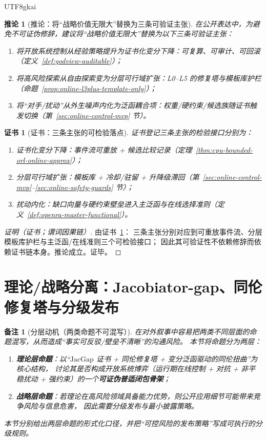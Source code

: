 \documentclass[12pt]{article}
\newtheorem{corollary}{推论}[section]
\newtheorem{remark}{备注}[section]
\newtheorem{Certificate}{证书}[section]
\newcommand{\JacGap}{\ensuremath{\mathrm{JacGap}}} %
\begin{document}
\begin{CJK*}{UTF8}{gkai}
\begin{corollary}[推论：将“战略价值无限大”替换为三条可验证主张]
\label{cor:replace-infinite-strategic-value}
在公开表达中，为避免不可证伪修辞，建议将“战略价值无限大”替换为以下三条可验证主张：
\begin{enumerate}
  \item 将开放系统控制从经验策略提升为证书化变分下降：可复算、可审计、可回滚（定义~\ref{def:godview-auditable}）；
  \item 将高风险探索从自由探索变为分层可行域扩张：L0--L5 的修复塔与模板库护栏（命题~\ref{prop:online-l3plus-template-only}）；
  \item 将“对手/扰动”从外生噪声内化为泛函耦合项：权重/硬约束/候选族随证书触发切换（第~\ref{sec:online-control-mvp} 节）。
\end{enumerate}
\end{corollary}

\begin{Certificate}[证书：三条主张的可检验落点]
\label{cert:replace-infinite-strategic-value}
证书登记三条主张的检验接口分别为：
\begin{enumerate}
  \item 证书化变分下降：事件流可重放 + 候选比较记录（定理~\ref{thm:cpu-bounded-orl-online-approx}）；
  \item 分层可行域扩张：模板库 + 冷却/驻留 + 升降级滞回（第~\ref{sec:online-control-mvp}--\ref{sec:online-safety-guards} 节）；
  \item 扰动内化：缺口向量与硬约束壁垒进入主泛函与在线选择准则（定义~\ref{def:openra-master-functional}）。
\end{enumerate}
\end{Certificate}

\begin{proof}[证明（证书；谓词因果链）]
由证书~\ref{cert:replace-infinite-strategic-value}：
三条主张分别对应到可重放事件流、分层模板库护栏与主泛函/在线准则三个可检验接口；
因此其可验证性不依赖修辞而依赖证书链本身。推论成立。证毕。
\end{proof}

\section{理论/战略分离：Jacobiator-gap、同伦修复塔与分级发布}
\label{sec:jacgap-theory-strategy}

\begin{remark}[分层动机（两类命题不可混写）]
在对外叙事中容易把两类不同层面的命题混写，从而造成“事实可反驳/壁垒不清晰”的沟通风险。
本节将命题分为两层：
\begin{enumerate}
  \item \textbf{理论层命题}：以“\JacGap{} 证书 + 同伦修复塔 + 变分泛函驱动的同伦扭曲”为核心结构，
  讨论其是否构成开放系统博弈（运行期在线控制 + 对抗 + 非平稳扰动 + 强约束）的一个\textbf{可证伪普适闭包骨架}；
  \item \textbf{战略层命题}：若理论在高风险领域具备能力优势，则公开应用细节可能带来竞争风险与信息危害，
  因此需要分级发布与最小披露策略。
\end{enumerate}
本节分别给出两层命题的形式化口径，并把“可控风险的发布策略”写成可执行的分级规则。
\end{remark}


\end{CJK*}
\end{document}
